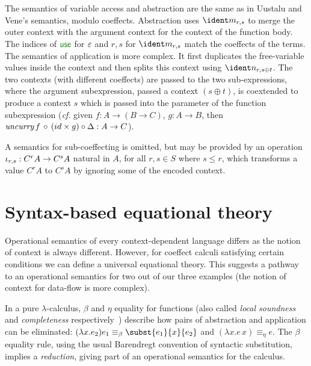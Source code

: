 The semantics of variable access and abstraction are the same as in
Uustalu and Vene's semantics, modulo coeffects. Abstraction uses $\cmerge_{r, s}$ to merge the outer
context with the argument context for the context of the function body.
The indices of $\cunit$ for
$\varepsilon$ and $r,s$ for $\cmerge_{r, s}$ match the coeffects
of the terms.
The semantics of application is more complex. It first duplicates the
free-variable values inside the context and then splits this context
using $\csplit_{r, {s \oplus t}}$. The two contexts (with
different coeffects) are passed to the two sub-expressions,
where the argument subexpression, passed a context $(s \oplus t)$,
is coextended to produce a context $s$ which is passed into
the parameter of the function subexpression (\emph{cf.} given $f : A \rightarrow (B \rightarrow C)$,
 $g : A \rightarrow B$, then $\emph{uncurry} \, f \, \circ \, (id \times g) \circ \Delta : A \rightarrow C$).

A semantics for sub-coeffecting is omitted, but may be provided
by an operation 
$\iota_{r, s} : C^{r} A \rightarrow C^{s} A$ natural in $A$, for all $r, s \in S$ where $s \leq r$,
which transforms a value $C^r A$ to $C^s A$ by
ignoring some of the encoded context.


\section{Syntax-based equational theory}
\label{sec:syntactic}

Operational semantics of every context-dependent language differs as the notion of context 
is always different. However, for coeffect calculi satisfying certain conditions we can 
define a universal equational theory. This suggests a pathway to an operational semantics for 
two out of our three examples (the notion of context for data-flow is more complex).

In a pure $\lambda$-calculus, $\beta$ and $\eta$ equality for
functions (also called \emph{local soundness} and \emph{completeness}
respectively~\cite{logic-modal-reconstruction})
describe how pairs of abstraction and application can be eliminated:
$(\lambda x . e_2) e_1 \equiv_\beta \subst{e_1}{x}{e_2}$ and $(\lambda x . e \, x) 
\equiv_\eta e$. The $\beta$ equality rule, using the usual Barendregt convention of 
syntactic substitution, implies a \emph{reduction},
giving part of an operational semantics for the calculus.

